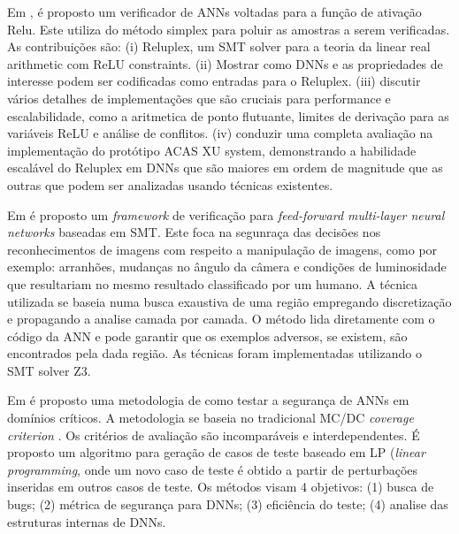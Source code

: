 Em \cite{reluplex}, é proposto um verificador de ANNs voltadas para a função de ativação Relu. Este utiliza do método simplex \cite{Bartels1971} para poluir as amostras a serem verificadas. As contribuições são: (i) Reluplex, um SMT solver para a teoria da linear real arithmetic com ReLU constraints. (ii) Mostrar como DNNs e as propriedades de interesse podem ser codificadas como entradas para o Reluplex. (iii) discutir vários detalhes de implementações que são cruciais para performance e escalabilidade, como a aritmetica de ponto flutuante, limites de derivação para as variáveis ReLU e análise de conflitos. (iv) conduzir uma completa avaliação na implementação do protótipo ACAS XU system, demonstrando a habilidade escalável do Reluplex em DNNs que são maiores em ordem de magnitude que as outras que podem ser analizadas usando técnicas existentes.


 Em \cite{marta2016} é proposto um \textit{framework} de verificação para \textit{feed-forward multi-layer neural networks} baseadas em SMT. Este foca na segunraça das decisões nos reconhecimentos de imagens com respeito a manipulação de imagens, como por exemplo: arranhões, mudanças no ângulo da câmera e condições de luminosidade que resultariam no mesmo resultado classificado por um humano. A técnica utilizada se baseia numa busca exaustiva de uma região empregando discretização e propagando a analise camada por camada. O método lida diretamente com o código da ANN e pode garantir que os exemplos adversos, se existem, são encontrados pela dada região. As técnicas foram implementadas utilizando o SMT solver Z3\cite{z3}.
 
 Em \cite{kroening2018} é proposto uma metodologia de como testar a segurança de ANNs em domínios críticos. A metodologia se baseia no tradicional MC/DC \textit{coverage criterion} \cite{chang2007}. Os critérios de avaliação são incomparáveis e interdependentes. É proposto um algoritmo para geração de casos de teste baseado em LP (\textit{linear programming}, onde um novo caso de teste é obtido a partir de perturbações inseridas em outros casos de teste. Os métodos visam 4 objetivos: (1) busca de bugs; (2) métrica de segurança para DNNs; (3) eficiência do teste; (4) analise das estruturas internas de DNNs.
 
 
 
 
 
 
 
 
 
 
 
 